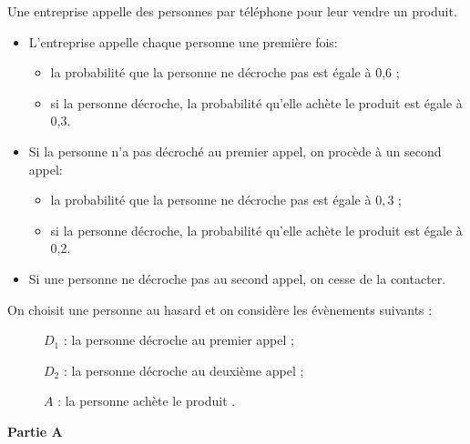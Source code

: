 \medskip

Une entreprise appelle des personnes par téléphone pour leur vendre un produit. 

\begin{itemize}
\item L'entreprise appelle chaque personne une première fois:
\begin{itemize}
\item[$\bullet~~$]la probabilité que la personne ne décroche pas est égale à 0,6 ;
\item[$\bullet~~$]si la personne décroche, la probabilité qu'elle achète le produit est égale à 0,3.
\end{itemize}
\item Si la personne n'a pas décroché au premier appel, on procède à un second appel: 
\begin{itemize}
\item[$\bullet~~$]la probabilité que la personne ne décroche pas est égale à $0,3$ ;
\item[$\bullet~~$]si la personne décroche, la probabilité qu'elle achète le produit est égale à 0,2.
\end{itemize}
\item Si une personne ne décroche pas au second appel, on cesse de la contacter.
\end{itemize}

\medskip

On choisit une personne au hasard et on considère les évènements suivants : 

\begin{description}
\item[ ] $D_1$ : \og la personne décroche au premier appel\fg{} ;
\item[ ] $D_2$ : \og la personne décroche au deuxième appel\fg{} ;
\item[ ] $A$ : \og la personne achète le produit \fg.
\end{description}



\bigskip

\textbf{Partie A}

